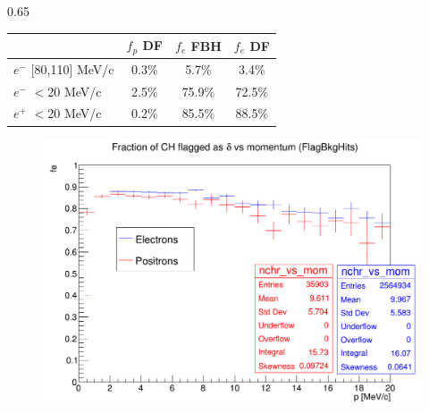 \documentclass{beamer}
\begin{document}
\begin{frame}
\begin{columns}
\begin{column}{0.65\framewidth}
\begin{table}[h!]
        \end{table}
        \vspace{-6mm}
        \begin{table}[h!]
    \centering
            \hspace*{-0.5em}
    \renewcommand{\arraystretch}{0.7}
    \begin{tabular}{| l | c | c | c |} 
    \hline
    &    {\scriptsize $f_{p}$ DF} & {\scriptsize $f_{e}$ FBH } & {\scriptsize $f_{e}$ DF} \\
    \hline
    {\scriptsize $e^-$} {\tiny[80,110] MeV/c}  & {\scriptsize 0.3\%}  &  {\scriptsize 5.7\%} & {\scriptsize 3.4\%}\\
    \hline
    {\scriptsize $e^-$} {\tiny$<$20 MeV/c}      & {\scriptsize 2.5\%}   & {\scriptsize 75.9\%} & {\scriptsize 72.5\%}\\
    \hline
    {\scriptsize $e^+$} {\tiny$<$20 MeV/c} & {\scriptsize 0.2\%}    &   {\scriptsize 85.5\%}& {\scriptsize 88.5\%}\\
    \hline
  

    \end{tabular}
    
    \end{table}
   
    \begin{figure}[!h]
        \centering
        \hspace*{-2.1em}
        \includegraphics[width =0.8\columnwidth]{figures/png/Screenshot_20240818_155835.png}
       \label{fig:0pbarbefore}
\end{figure}

 
   
       
\end{column}
\end{columns}

       
   
   
\end{frame}
\end{document}
